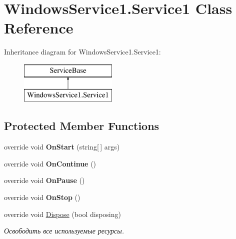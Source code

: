 \hypertarget{class_windows_service1_1_1_service1}{}\section{Windows\+Service1.\+Service1 Class Reference}
\label{class_windows_service1_1_1_service1}
Inheritance diagram for Windows\+Service1.\+Service1\+:\begin{figure}[H]
\begin{center}
\leavevmode
\includegraphics[height=2.000000cm]{class_windows_service1_1_1_service1}
\end{center}
\end{figure}
\subsection*{Protected Member Functions}
\begin{DoxyCompactItemize}
\item 
\hypertarget{class_windows_service1_1_1_service1_a625f720f2cd425cf8e90ec7432947ef9}{}\label{class_windows_service1_1_1_service1_a625f720f2cd425cf8e90ec7432947ef9} 
override void {\bfseries On\+Start} (string\mbox{[}$\,$\mbox{]} args)
\item 
\hypertarget{class_windows_service1_1_1_service1_ab9ac7ce457cd629619ef63dd097cae38}{}\label{class_windows_service1_1_1_service1_ab9ac7ce457cd629619ef63dd097cae38} 
override void {\bfseries On\+Continue} ()
\item 
\hypertarget{class_windows_service1_1_1_service1_a7fece590f3df413de51dde388a241314}{}\label{class_windows_service1_1_1_service1_a7fece590f3df413de51dde388a241314} 
override void {\bfseries On\+Pause} ()
\item 
\hypertarget{class_windows_service1_1_1_service1_ae5e4fb04766a3a46b4a93a3bc868b034}{}\label{class_windows_service1_1_1_service1_ae5e4fb04766a3a46b4a93a3bc868b034} 
override void {\bfseries On\+Stop} ()
\item 
override void \hyperlink{class_windows_service1_1_1_service1_ae10ffc85ffbeade32c0c40756c334c73}{Dispose} (bool disposing)
\begin{DoxyCompactList}\small\item\em Освободить все используемые ресурсы. \end{DoxyCompactList}\end{DoxyCompactItemize}


